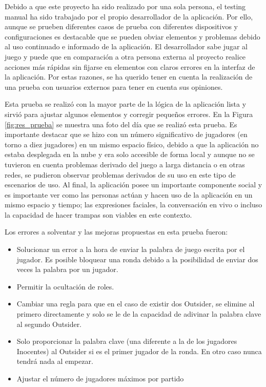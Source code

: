Debido a que este proyecto ha sido realizado por una sola persona, el testing manual ha sido trabajado por el propio desarrollador de la aplicación.
Por ello, aunque se prueben diferentes casos de prueba con diferentes dispositivos y configuraciones es destacable que se pueden obviar elementos y problemas
debido al uso continuado e informado de la aplicación. El desarrollador sabe jugar al juego y puede que en comparación a otra persona externa al 
proyecto realice acciones más rápidas sin fijarse en elementos con claros errores en la interfaz de la aplicación. Por estas razones, se ha querido tener
en cuenta la realización de una prueba con usuarios externos para tener en cuenta sus opiniones.

Esta prueba se realizó con la mayor parte de la lógica de la aplicación lista y sirvió para ajustar algunos elementos y corregir pequeños errores.
En la Figura \ref{fig:res_prueba} se muestra una foto del día que se realizó esta prueba. Es importante destacar que se hizo con un número
significativo de jugadores (en torno a diez jugadores) en un mismo
espacio físico, debido a que la aplicación no estaba desplegada en la nube y era solo accesible de forma local y aunque no se tuvieron en cuenta problemas derivado
del juego a larga distancia o en otras redes, se pudieron observar problemas derivados de su uso en este tipo de escenarios de uso. Al final, la 
aplicación posee un importante componente social y es importante ver como las personas actúan y hacen uso de la aplicación en un mismo espacio y tiempo; las
expresiones faciales, la conversación en vivo o incluso la capacidad de hacer trampas son viables en este contexto.

Los errores a solventar y las mejoras propuestas en esta prueba fueron:

\begin{itemize}
	\item Solucionar un error a la hora de enviar la palabra de juego escrita por el jugador. Es posible bloquear una ronda debido a la posibilidad de enviar dos veces
	 	  la palabra por un jugador.
	\item Permitir la ocultación de roles.
	\item Cambiar una regla para que en el caso de existir dos Outsider, se elimine al primero directamente y solo se le de la capacidad de adivinar
		  la palabra clave al segundo Outsider.
	\item Solo proporcionar la palabra clave (una diferente a la de los jugadores Inocentes) al Outsider si es el primer jugador de la ronda. 
		  En otro caso nunca tendrá nada al empezar.
	\item Ajustar el número de jugadores máximos por partido
\end{itemize}

